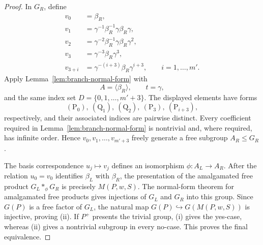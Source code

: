 \documentclass[10pt,a4paper]{amsart}
\begin{document}
\begin{proof}
		In $G_R$, define
		\[
		\begin{aligned}
			v_0&=\beta_R,\\
			v_1&=\gamma^{-1}\beta_R^{-1}\gamma\beta_R\gamma,\\
			v_2&=\gamma^{-2}\beta_R^{-1}\gamma\beta_R\gamma^2,\\
			v_3&=\gamma^{-3}\beta_R\gamma^3,\\
			v_{3+i}&=\gamma^{-(i+3)}\beta_R\gamma^{i+3},
			\qquad i=1,\ldots,m'.
		\end{aligned}
		\]
		Apply Lemma~\ref{lem:branch-normal-form} with
		\[
		A=\langle\beta_R\rangle,\qquad t=\gamma,
		\]
		and the same index set $D=\{0,1,\ldots,m'+3\}$. The displayed elements have forms
		\[
		(\mathrm{P}_0),\ (\mathrm{Q}_1),\ (\mathrm{Q}_2),\ (\mathrm{P}_3),\ (\mathrm{P}_{i+3}),
		\]
		respectively, and their associated indices are pairwise distinct. Every coefficient required in Lemma~\ref{lem:branch-normal-form} is nontrivial and, where required, has infinite order. Hence
		$
		v_0,v_1,\ldots,v_{m'+3}
		$
		freely generate a free subgroup $A_R\le G_R$.
		
		The basis correspondence $u_j\mapsto v_j$ defines an isomorphism
		\(
		\phi\colon A_L\longrightarrow A_R.
		\)
		After the relation $u_0=v_0$ identifies $\beta_L$ with $\beta_R$, the
		presentation of the amalgamated free product
		$
		G_L*_{\phi}G_R
		$
		is precisely $M(P,w,S)$. The normal-form theorem for amalgamated free
		products gives injections of $G_L$ and $G_R$ into this group. Since
		$G(P)$ is a free factor of $G_L$, the natural map
		$
		G(P)\hookrightarrow G(M(P,w,S))
		$
		is injective, proving (ii). If $P^+$ presents the trivial group, (i) gives the yes-case,
		whereas (ii) gives a nontrivial subgroup in every no-case. This proves the
		final equivalence.
	\end{proof}
\end{document}
